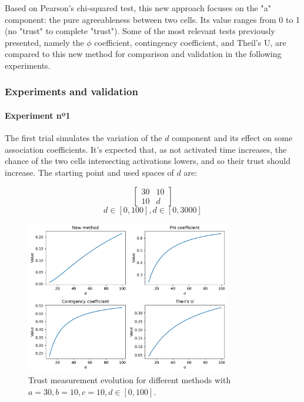 Based on Pearson's chi-squared test, this new approach focuses on the "a" component: the pure agreeableness between two cells. Its value ranges from 0 to 1 (no "trust" to complete "trust"). Some of the most relevant tests previously presented, namely the $\phi$ coefficient, contingency coefficient, and Theil's U, are compared to this new method for comparison and validation in the following experiments.

\subsubsection{Experiments and validation}

\paragraph{Experiment nº1}

The first trial simulates the variation of the $d$ component and its effect on some association coefficients. It's expected that, as not activated time increases, the chance of the two cells intersecting activations lowers, and so their trust should increase. The starting point and used spaces of $d$ are:

$$
\begin{bmatrix}
    30 & 10 \\ 10 & d
\end{bmatrix}
$$
$$
d \in [0, 100], d \in [0, 3000]
$$

\begin{figure}[h!]
\centering
    \includegraphics[width=0.8\textwidth]{figures/chapter4/cell/trust_tests/1_a.pdf}
    \caption{Trust measurement evolution for different methods with $a=30, b=10, c=10, d \in [0, 100]$.}
    \label{fig:trust_test_1_a}
\end{figure}
\FloatBarrier


